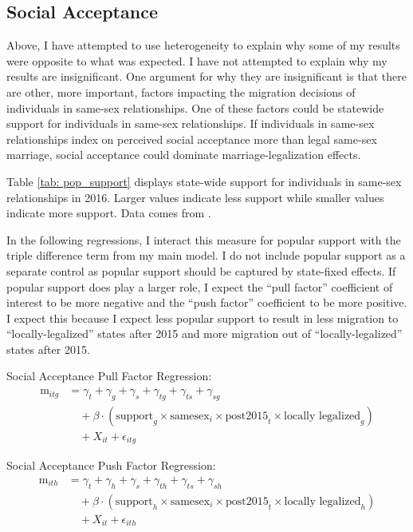 \documentclass[12pt,letterpaper]{article}
\begin{document}
\clearpage
\subsection{Social Acceptance}

Above, I have attempted to use heterogeneity to explain why some of my results were opposite to what was expected. I have not attempted to explain why my results are insignificant. One argument for why they are insignificant is that there are other, more important, factors impacting the migration decisions of individuals in same-sex relationships. One of these factors could be statewide support for individuals in same-sex relationships. If individuals in same-sex relationships index on perceived social acceptance more than legal same-sex marriage, social acceptance could dominate marriage-legalization effects.

Table \ref{tab: pop_support} displays state-wide support for individuals in same-sex relationships in 2016. Larger values indicate less support while smaller values indicate more support. Data comes from \citet{29}.



In the following regressions, I interact this measure for popular support with the triple difference term from my main model. I do not include popular support as a separate control as popular support should be captured by state-fixed effects. If popular support does play a larger role, I expect the “pull factor” coefficient of interest to be more negative and the “push factor” coefficient to be more positive. I expect this because I expect less popular support to result in less migration to “locally-legalized” states after 2015 and more migration out of “locally-legalized” states after 2015. 

\hfill
\break
Social Acceptance Pull Factor Regression:
\begin{equation}
\begin{aligned}
\text{m}_{itg} &= \gamma_t + \gamma_g + \gamma_s + \gamma_{tg} + \gamma_{ts} + \gamma_{sg} \\
&\quad + \beta \cdot (\text{support}_g \times \text{samesex}_i \times \text{post2015}_t \times \text{locally legalized}_g) \\
&\quad + X_{it} + \epsilon_{itg}
\end{aligned}
\end{equation}

\hfill
\break
Social Acceptance Push Factor Regression:
\begin{equation}
\begin{aligned}
\text{m}_{ith} &= \gamma_t + \gamma_h + \gamma_s + \gamma_{th} + \gamma_{ts} + \gamma_{sh} \\
&\quad + \beta \cdot (\text{support}_h \times \text{samesex}_i \times \text{post2015}_t \times \text{locally legalized}_h) \\
&\quad + X_{it} + \epsilon_{ith}
\end{aligned}
\end{equation}
\end{document}
